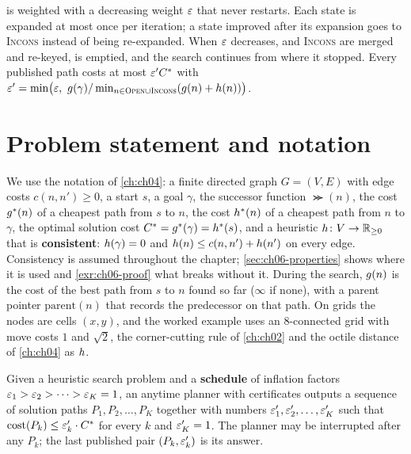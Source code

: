 \begin{keyidea}
\arastar is weighted \astar with a decreasing weight $\varepsilon$ that never
restarts. Each state is expanded at most once per iteration; a state improved
after its expansion goes to \textsc{Incons} instead of being re-expanded. When
$\varepsilon$ decreases, \Open and \textsc{Incons} are merged and re-keyed, \Closed is
emptied, and the search continues from where it stopped. Every published path
costs at most $\varepsilon' C^*$ with $\varepsilon' = \min\bigl(\varepsilon,\ g(\gamma) /
\min_{n \in \textsc{Open} \cup \textsc{Incons}} (g(n) + h(n))\bigr)$.
\end{keyidea}

\section{Problem statement and notation}
\label{sec:ch06-problem}

We use the notation of \cref{ch:ch04}: a finite directed graph $G = (V, E)$
with edge costs $c(n, n') \ge 0$, a start $s$, a goal $\gamma$, the successor
function $\Succ(n)$, the cost $g^*(n)$ of a cheapest path from $s$ to $n$,
the cost $h^*(n)$ of a cheapest path from $n$ to $\gamma$, the optimal
solution cost $C^* = g^*(\gamma) = h^*(s)$, and a heuristic
$h \colon V \to \mathbb{R}_{\ge 0}$ that is \textbf{consistent}: $h(\gamma) =
0$ and $h(n) \le c(n, n') + h(n')$ on every edge. Consistency is
assumed throughout the chapter; \cref{sec:ch06-properties} shows where it is
used and \cref{exr:ch06-proof} what breaks without it. During the search,
$g(n)$ is the cost of the best path from $s$ to $n$ found so far
($\infty$ if none), with a parent pointer $\mathrm{parent}(n)$ that records
the predecessor on that path. On grids the nodes are cells $(x, y)$, and the
worked example uses an 8-connected grid with move costs $1$ and $\sqrt{2}$, the
corner-cutting rule of \cref{ch:ch02} and the octile distance of
\cref{ch:ch04} as $h$.

\begin{definition}
\label{def:ch06-anytime}
Given a heuristic search problem and a \textbf{schedule} of inflation factors
$\varepsilon_1 > \varepsilon_2 > \dots > \varepsilon_K = 1$, an anytime planner with certificates
outputs a sequence of solution paths $P_1, P_2, \dots, P_K$ together with
numbers $\varepsilon'_1, \varepsilon'_2, \dots, \varepsilon'_K$ such that $\operatorname{cost}(P_k) \le \varepsilon'_k
\cdot C^*$ for every $k$ and $\varepsilon'_K = 1$. The planner may be interrupted
after any $P_k$; the last published pair $(P_k, \varepsilon'_k)$ is its answer.
\end{definition}


